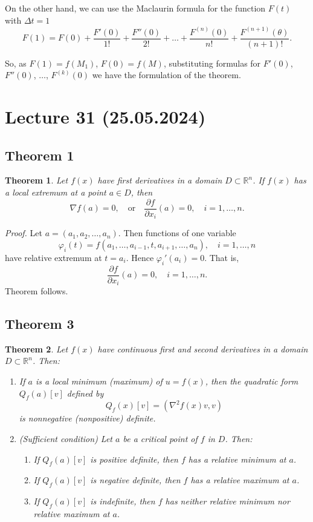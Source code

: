 \documentclass{article}
\newtheorem{theorem}{Theorem}
\begin{document}
On the other hand, we can use the Maclaurin formula for the function $F(t)$ with $\Delta t = 1$
\[
F(1) = F(0) + \frac{F'(0)}{1!} + \frac{F''(0)}{2!} + \dots + \frac{F^{(n)}(0)}{n!} + \frac{F^{(n+1)}(\theta)}{(n+1)!}.
\]

So, as $F(1) = f(M_1)$, $F(0) = f(M)$, substituting formulas for $F'(0)$, $F''(0)$, $\dots$, $F^{(k)}(0)$ we have the formulation of the theorem.

\section*{Lecture 31 (25.05.2024)}

\subsection*{Theorem 1}

\begin{theorem}
Let $f(x)$ have first derivatives in a domain $D \subset \mathbb{R}^n$. If $f(x)$ has a local extremum at a point $a \in D$, then
\[
\nabla f(a) = 0, \quad \text{or} \quad \frac{\partial f}{\partial x_i}(a) = 0, \quad i = 1, \ldots, n.
\]
\end{theorem}

\vspace{1em}

\textit{Proof.} Let $a = (a_1, a_2, \ldots, a_n)$. Then functions of one variable
\[
\varphi_i(t) = f(a_1, \ldots, a_{i-1}, t, a_{i+1}, \ldots, a_n), \quad i = 1, \ldots, n
\]
have relative extremum at $t = a_i$. Hence $\varphi_i'(a_i) = 0$. That is,
\[
\frac{\partial f}{\partial x_i}(a) = 0, \quad i = 1, \ldots, n.
\]
Theorem follows.

\subsection*{Theorem 3}

\begin{theorem}
Let $f(x)$ have continuous first and second derivatives in a domain $D \subset \mathbb{R}^n$. Then:
\begin{enumerate}
    \item If $a$ is a local minimum (maximum) of $u = f(x)$, then the quadratic form $Q_f(a)[v]$ defined by
    \[
    Q_f(x)[v] = \left( \nabla^2 f(x)v, v \right)
    \]
    is nonnegative (nonpositive) definite.
    \item (Sufficient condition) Let $a$ be a critical point of $f$ in $D$. Then:
    \begin{enumerate}
        \item If $Q_f(a)[v]$ is positive definite, then $f$ has a relative minimum at $a$.
        \item If $Q_f(a)[v]$ is negative definite, then $f$ has a relative maximum at $a$.
        \item If $Q_f(a)[v]$ is indefinite, then $f$ has neither relative minimum nor relative maximum at $a$.
    \end{enumerate}
\end{enumerate}
\end{theorem}
\end{document}
